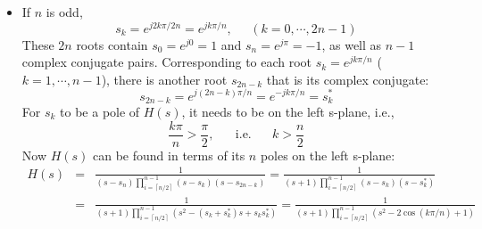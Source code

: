 \documentclass{article}
\begin{document}
\begin{itemize}
  \item If $n$ is odd, 
    \begin{equation}
    s_k=e^{j2k\pi/2n}=e^{jk\pi/n},\;\;\;\;\;(k=0,\cdots,2n-1)
    \end{equation}
    These $2n$ roots contain $s_0=e^{j0}=1$ and $s_n=e^{j\pi}=-1$, as well as
    $n-1$ complex conjugate pairs. Corresponding to each root $s_k=e^{jk\pi/n}$ 
    ($k=1,\cdots,n-1$), there is another root $s_{2n-k}$ that is its complex 
    conjugate:
    \begin{equation}
    s_{2n-k}=e^{j(2n-k)\pi/n}=e^{-jk\pi/n}=s_k^*
    \end{equation}
    For $s_k$ to be a pole of $H(s)$, it needs to be on the left s-plane, i.e.,
    \begin{equation}
    \frac{k\pi}{n}>\frac{\pi}{2},\;\;\;\;\;\;\mbox{i.e.}\;\;\;\;\;\;k>\frac{n}{2}
    \end{equation}
    Now $H(s)$ can be found in terms of its $n$ poles on the left s-plane:
    \begin{eqnarray}
    H(s)&=&\frac{1}{(s-s_n)\prod_{i=\left\lceil n/2 \right\rceil}^{n-1}(s-s_k)(s-s_{2n-k})}
    =\frac{1}{(s+1)\prod_{i=\left\lceil n/2 \right\rceil}^{n-1}(s-s_k)(s-s_k^*)}
    \nonumber \\
    &=&\frac{1}{(s+1)\prod_{i=\left\lceil n/2 \right\rceil}^{n-1}(s^2-(s_k+s_k^*)s+s_k s_k^*)}
    =\frac{1}{(s+1)\prod_{i=\left\lceil n/2 \right\rceil}^{n-1}(s^2-2\cos(k\pi/n)+1)}
    \end{eqnarray}

  \end{itemize}
\end{document}
